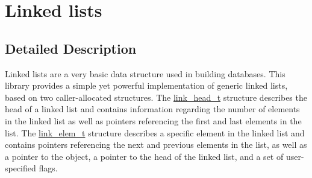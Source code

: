 \hypertarget{group__dbprim__link}{
\section{Linked lists}
\label{group__dbprim__link}
}


\subsection{Detailed Description}
Linked lists are a very basic data structure used in building databases. This library provides a simple yet powerful implementation of generic linked lists, based on two caller-allocated structures. The \hyperlink{group__dbprim__link_a0}{link\_\-head\_\-t} structure describes the head of a linked list and contains information regarding the number of elements in the linked list as well as pointers referencing the first and last elements in the list. The \hyperlink{group__dbprim__link_a1}{link\_\-elem\_\-t} structure describes a specific element in the linked list and contains pointers referencing the next and previous elements in the list, as well as a pointer to the object, a pointer to the head of the linked list, and a set of user-specified flags.

